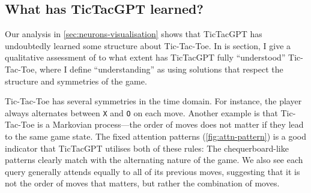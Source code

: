 \documentclass{article}
\newcommand{\ttgpt}{TicTacGPT\xspace}
\newcommand{\ttt}{Tic-Tac-Toe\xspace}
\begin{document}



% 


\subsection{What has \ttgpt learned?}

Our analysis in \cref{sec:neurons-visualisation} shows that \ttgpt has undoubtedly learned some structure about \ttt. In is section, I give a qualitative assessment of to what extent has \ttgpt fully ``understood'' \ttt, where I define ``understanding'' as using solutions that respect the structure and symmetries of the game.

\ttt has several symmetries in the time domain. For instance, the player always alternates between \texttt{X} and \texttt{O} on each move. Another example is that \ttt is a Markovian process---the order of moves does not matter if they lead to the same game state. The fixed attention patterns (\cref{fig:attn-pattern}) is a good indicator that \ttgpt utilises both of these rules: The chequerboard-like patterns clearly match with the alternating nature of the game. We also see each query generally attends equally to all of its previous moves, suggesting that it is not the order of moves that matters, but rather the combination of moves.
\end{document}
